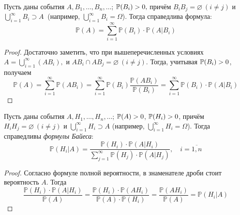 \begin{namedthm}
    Пусть даны события $A, B_1, \ldots, B_n, \ldots$; ${\mathbb{P}(B_i)} > 0, $ причём $B_i B_j = \varnothing~(i \neq j)$ и $\bigcup\limits_{i=1}^{\infty}B_i \supset A~$ (например, $\bigcup\limits_{i=1}^{\infty}B_i = \Omega$). Тогда справедлива формула:
\begin{equation*}
    \mathbb{P}(A)=\sum\limits_{i=1}^{\infty} \mathbb{P}\left(B_{i}\right) \cdot \mathbb{P}\left(A | B_{i}\right)
\end{equation*}
\end{namedthm}

\begin{proof}
    Достаточно заметить, что при вышеперечисленных условиях $A = \bigcup\limits_{i=1}^{\infty}(AB_i),$ и $AB_i \cap AB_j = \varnothing ~(i \neq j).$ Тогда, учитывая ${\mathbb{P}(B_i)} > 0$, получаем
    \begin{equation*}
        \mathbb{P}(A)=\sum\limits_{i=1}^{\infty} \mathbb{P}\left(A B_{i}\right)=\sum\limits_{i=1}^{\infty} \mathbb{P}\left(B_{i}\right) \frac{\mathbb{P}\left(A B_{i}\right)}{\mathbb{P}\left(B_{i}\right)}=\sum\limits_{i=1}^{\infty} \mathbb{P}\left(B_{i}\right) \cdot \mathbb{P}\left(A | B_{i}\right)
    \end{equation*}
\end{proof}

\begin{namedthm}
    Пусть даны события $A, H_1, \ldots, H_n, \ldots$; ${{\mathbb{P}(A)} > 0}$, ${{\mathbb{P}(H_i)} > 0}$, причём $H_i H_j = \varnothing ~(i \neq j)$ и $\bigcup\limits_{i=1}^\infty H_i \supset A$ (например, $\bigcup\limits_{i=1}^{\infty}H_i = \Omega$). Тогда справедливы {\it формулы Байеса}:
    \begin{equation*}
        \mathbb{P}\left(H_{i} | A\right)= \frac{\mathbb{P}\left(H_{i}\right) \cdot \mathbb{P}\left(A | H_{i}\right)}{\sum\limits_{j=1}^{\infty} \mathbb{P}\left(H_{j}\right) \cdot \mathbb{P}\left(A | H_{j}\right)}, \quad i = \overline{1,n}
    \end{equation*}
\end{namedthm}
\begin{proof}
    Согласно формуле полной вероятности, в знаменателе дроби стоит вероятность $A$. Тогда
    \begin{equation*}
        \frac{\mathbb{P}\left(H_{i}\right) \cdot \mathbb{P}\left(A | H_{i}\right)}{\mathbb{P}(A)}=\frac{\mathbb{P}\left(H_{i}\right) \cdot \mathbb{P}\left(A H_{i}\right)}{\mathbb{P}(A) \cdot \mathbb{P}\left(H_{i}\right)}=\frac{\mathbb{P}\left(A H_{i}\right)}{\mathbb{P}(A)}=\mathbb{P}\left(H_{i} | A\right) 
    \end{equation*}
\end{proof}

